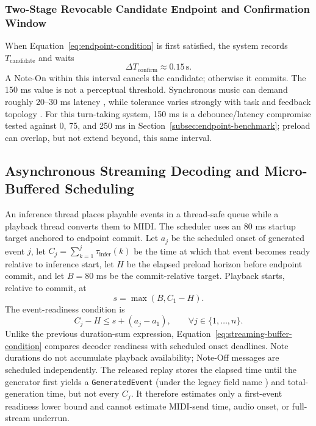\documentclass[11pt,a4paper]{article}
\begin{document}
\subsubsection{Two-Stage Revocable Candidate Endpoint and Confirmation Window}
\label{sec:revocable-endpoint}

When Equation~\eqref{eq:endpoint-condition} is first satisfied, the system records $T_{\mathrm{candidate}}$ and waits
\begin{equation}
\Delta T_{\mathrm{confirm}} \approx 0.15\,\mathrm{s}.
\label{eq:confirm-window}
\end{equation}
A Note-On within this interval cancels the candidate; otherwise it commits. The 150 ms value is not a perceptual threshold. Synchronous music can demand roughly 20--30 ms latency \citep{lago2004quest}, while tolerance varies strongly with task and feedback topology \citep{rottondi2016overview}. For this turn-taking system, 150 ms is a debounce/latency compromise tested against 0, 75, and 250 ms in Section~\ref{subsec:endpoint-benchmark}; preload can overlap, but not extend beyond, this same interval.
\subsection{Asynchronous Streaming Decoding and Micro-Buffered Scheduling}
\label{sec:streaming-decoding}

An inference thread places playable events in a thread-safe queue while a playback thread converts them to MIDI. The scheduler uses an 80 ms startup target anchored to endpoint commit. Let $a_j$ be the scheduled onset of generated event $j$, let $C_j=\sum_{k=1}^{j}\tau_{\mathrm{infer}}(k)$ be the time at which that event becomes ready relative to inference start, let $H$ be the elapsed preload horizon before endpoint commit, and let $B=80$ ms be the commit-relative target. Playback starts, relative to commit, at
\begin{equation}
s=\max(B,C_1-H).
\label{eq:commit-anchored-start}
\end{equation}
The event-readiness condition is
\begin{equation}
C_j-H \leq s+(a_j-a_1),
\qquad \forall j\in\{1,\ldots,n\}.
\label{eq:streaming-buffer-condition}
\end{equation}
Unlike the previous duration-sum expression, Equation~\eqref{eq:streaming-buffer-condition} compares decoder readiness with scheduled onset deadlines. Note durations do not accumulate playback availability; Note-Off messages are scheduled independently. The released replay stores the elapsed time until the generator first yields a \texttt{GeneratedEvent} (under the legacy field name ) and total-generation time, but not every $C_j$. It therefore estimates only a first-event readiness lower bound and cannot estimate MIDI-send time, audio onset, or full-stream underrun.
\end{document}
